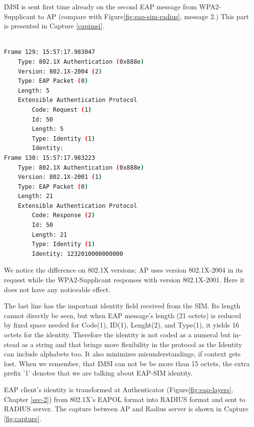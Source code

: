 \documentclass[12pt,a4paper,english]{tutthesis}
\begin{document}
\begin{otherlanguage}{english}
IMSI is sent first time already on the second EAP message from 
WPA2-Supplicant to AP (compare with Figure\ref{fig:eap-sim-radius}, message 2.)
This part is presented in Capture \ref{capimsi}.

\renewcommand{\lstlistingname}{Capture}

\begin{lstlisting}[language=bash,
  label=capimsi,
  caption={First indication of IMSI}
]

Frame 129: 15:57:17.983047
    Type: 802.1X Authentication (0x888e)
    Version: 802.1X-2004 (2)
    Type: EAP Packet (0)
    Length: 5
    Extensible Authentication Protocol
        Code: Request (1)
        Id: 50
        Length: 5
        Type: Identity (1)
        Identity: 
Frame 130: 15:57:17.983223
    Type: 802.1X Authentication (0x888e)
    Version: 802.1X-2001 (1)
    Type: EAP Packet (0)
    Length: 21
    Extensible Authentication Protocol
        Code: Response (2)
        Id: 50
        Length: 21
        Type: Identity (1)
        Identity: 1232010000000000
\end{lstlisting}
\normalsize

We notice the difference on 802.1X versions; AP uses version
802.1X-2004 in its request while the WPA2-Supplicant
responses with version 802.1X-2001. Here it does not have any
noticeable effect. 

The last line has the important identity field received from the SIM.
Its length cannot directly be seen, but when EAP message's length (21
octets) is reduced by fixed space needed for Code(1), ID(1),
Lenght(2), and Type(1), it yields 16 octets for the
identity. Therefore the identity is not coded as a 
numeral but instead as a string and that brings more flexibility in
the protocol as the Identity can include alphabets too. It also
minimizes misunderstandings, if context gets lost. 
When we remember, that IMSI can not be be more than 15 octets, the extra prefix '1'
denotes that we are talking about EAP-SIM identity. 





EAP client's identity is transformed at Authenticator
(Figure\ref{fig:eap-layers}, Chapter \ref{sec-2}) from 802.1X's 
EAPOL format  into RADIUS format and
sent to RADIUS server. The capture between AP and Radius server is
shown
in Capture \ref{fig:capture}.


\renewcommand{\lstlistingname}{Capture}


\end{otherlanguage}
\end{document}
